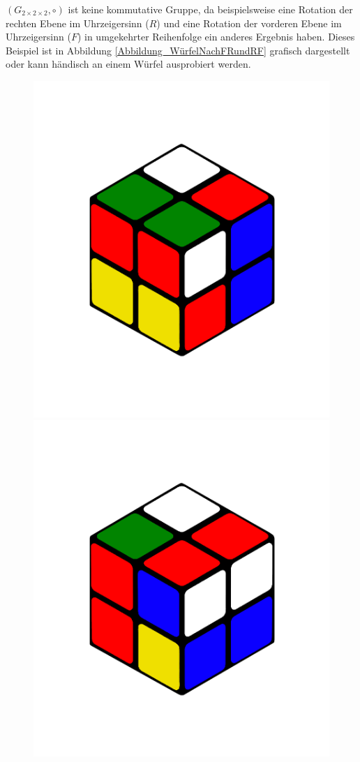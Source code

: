 \documentclass[12pt,a4paper, usenames, dvipsnames]{article}
\theoremstyle{mystyle}
\theoremstyle{definition}
\newcommand{\Gtwo}{\ensuremath{G_{2\times 2\times 2}}}
\begin{document}
$(\Gtwo, \circ)$ ist keine kommutative Gruppe, da beispielsweise eine Rotation der rechten Ebene im Uhrzeigersinn ($R$) und eine Rotation der vorderen Ebene im Uhrzeigersinn ($F$) in umgekehrter Reihenfolge ein anderes Ergebnis haben. Dieses Beispiel ist in Abbildung \ref{Abbildung_WürfelNachFRundRF} grafisch dargestellt oder kann händisch an einem Würfel ausprobiert werden.
\begin{figure}[H]
\centering
\includegraphics[scale=0.1]{RF.png}
\includegraphics[scale=0.1]{FR.png}

\end{figure}
\end{document}
